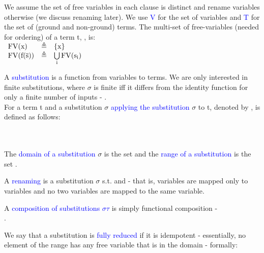 We assume the set of free variables in each clause is distinct and rename variables otherwise (we discuss renaming later). 
We use \textcolor{blue}{V} for the set of variables and \textcolor{blue}{T} for the set of (ground and non-ground) terms.
The multi-set of free-variables (needed for ordering) of a term t, , is:\\
$ 
\begin{array}{lll}
	\mathrm{FV}(\mathrm{x})         & \triangleq & \left\{\mathrm{x}\right\}\\
	\mathrm{FV}(\mathrm{\mathrm{f}(\mathrm{\overline{s}})}) & \triangleq & \bigcup\limits_{\mathrm{i}} \mathrm{FV}(\mathrm{s_i})\\
\end{array} 
$

\bigskip
\noindent
A \textcolor{blue}{substitution}  is a function from variables to terms. 
We are only interested in finite substitutions, where $\sigma$ is finite iff it differs from the identity function for only a finite number of inputs - .\\
For a term t and a substitution $\sigma$ \textcolor{blue}{applying the substitution} $\sigma$ to t, denoted by , is defined as follows:\\
\\
\\

\bigskip
\noindent
The \textcolor{blue}{domain of a substitution} $\sigma$ is the set   and the \textcolor{blue}{range of a substitution} is the set .


\noindent
A \textcolor{blue}{renaming} is a substitution $\sigma$ s.t.  and  - that is, variables are mapped only to variables and no two variables are mapped to the same variable.

\noindent
A \textcolor{blue}{composition of substitutions $\sigma\tau$} is simply functional composition -\\
 .

\noindent
We say that a substitution is \textcolor{blue}{fully reduced} if it is idempotent - essentially, no element of the range has any free variable that is in the domain - formally:\\

